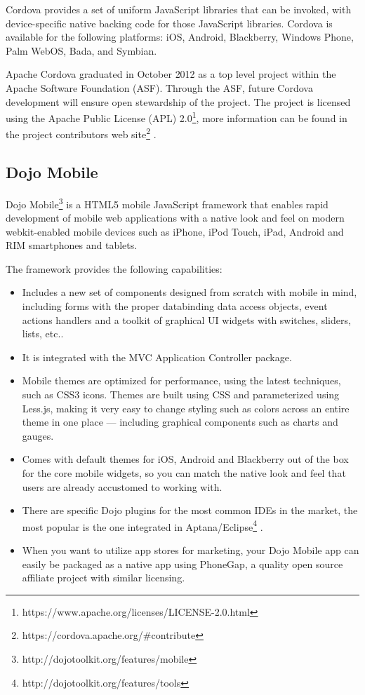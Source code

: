 \documentclass[a4paper,12pt]{book}
\begin{document}
Cordova provides a set of uniform JavaScript libraries that can be invoked, with device-specific native backing code for those JavaScript libraries. Cordova is available for the following platforms: iOS, Android, Blackberry, Windows Phone, Palm WebOS, Bada, and Symbian.

Apache Cordova graduated in October 2012 as a top level project within the Apache Software Foundation (ASF). Through the ASF, future Cordova development will ensure open stewardship of the project. The project is licensed using the Apache Public License (APL) 2.0\footnote{https://www.apache.org/licenses/LICENSE-2.0.html}, more information can be found in the project contributors web site\footnote{https://cordova.apache.org/\#contribute} .

\subsection{Dojo Mobile}
\label{Dojo Mobile} 

Dojo Mobile\footnote{http://dojotoolkit.org/features/mobile}  is a HTML5 mobile JavaScript framework that enables rapid development of mobile web applications with a native look and feel on modern webkit-enabled mobile devices such as iPhone, iPod Touch, iPad, Android and RIM smartphones and tablets.

The framework provides the following capabilities:
\begin{itemize}
\item Includes a new set of components designed from scratch with mobile in mind, including forms with the proper databinding data access objects, event actions handlers and a toolkit of graphical UI widgets with switches, sliders, lists, etc..
\item It is integrated with the MVC Application Controller package.
\item Mobile themes are optimized for performance, using the latest techniques, such as CSS3 icons. Themes are built using CSS and parameterized using Less.js, making it very easy to change styling such as colors across an entire theme in one place — including graphical components such as charts and gauges.
\item Comes with default themes for iOS, Android and Blackberry out of the box for the core mobile widgets, so you can match the native look and feel that users are already accustomed to working with.
\item There are specific Dojo plugins for the most common IDEs in the market, the most popular is the one integrated in Aptana/Eclipse\footnote{http://dojotoolkit.org/features/tools} . 
\item When you want to utilize app stores for marketing, your Dojo Mobile app can easily be packaged as a native app using PhoneGap, a quality open source affiliate project with similar licensing.
\end{itemize}
\end{document}
